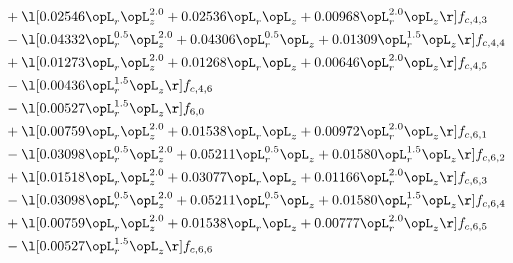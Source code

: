 \begin{alignat}{2}
& + \l[  0.02546 \opL_r \opL_z^{2.0} +  0.02536 \opL_r \opL_z +  0.00968 \opL_r^{2.0} \opL_z  \r] f_{c,4,3} \nonumber \\ 
& - \l[  0.04332 \opL_r^{0.5} \opL_z^{2.0} +  0.04306 \opL_r^{0.5} \opL_z +  0.01309 \opL_r^{1.5} \opL_z  \r] f_{c,4,4} \nonumber \\ 
& + \l[  0.01273 \opL_r \opL_z^{2.0} +  0.01268 \opL_r \opL_z +  0.00646 \opL_r^{2.0} \opL_z  \r] f_{c,4,5} \nonumber \\ 
& - \l[  0.00436 \opL_r^{1.5} \opL_z  \r] f_{c,4,6} \nonumber \\ 
& - \l[  0.00527 \opL_r^{1.5} \opL_z  \r] f_{6,0} \nonumber \\ 
& + \l[  0.00759 \opL_r \opL_z^{2.0} +  0.01538 \opL_r \opL_z +  0.00972 \opL_r^{2.0} \opL_z  \r] f_{c,6,1} \nonumber \\ 
& - \l[  0.03098 \opL_r^{0.5} \opL_z^{2.0} +  0.05211 \opL_r^{0.5} \opL_z +  0.01580 \opL_r^{1.5} \opL_z  \r] f_{c,6,2} \nonumber \\ 
& + \l[  0.01518 \opL_r \opL_z^{2.0} +  0.03077 \opL_r \opL_z +  0.01166 \opL_r^{2.0} \opL_z  \r] f_{c,6,3} \nonumber \\ 
& - \l[  0.03098 \opL_r^{0.5} \opL_z^{2.0} +  0.05211 \opL_r^{0.5} \opL_z +  0.01580 \opL_r^{1.5} \opL_z  \r] f_{c,6,4} \nonumber \\ 
& + \l[  0.00759 \opL_r \opL_z^{2.0} +  0.01538 \opL_r \opL_z +  0.00777 \opL_r^{2.0} \opL_z  \r] f_{c,6,5} \nonumber \\ 
& - \l[  0.00527 \opL_r^{1.5} \opL_z  \r] f_{c,6,6} \nonumber \\ 
\end{alignat} 


